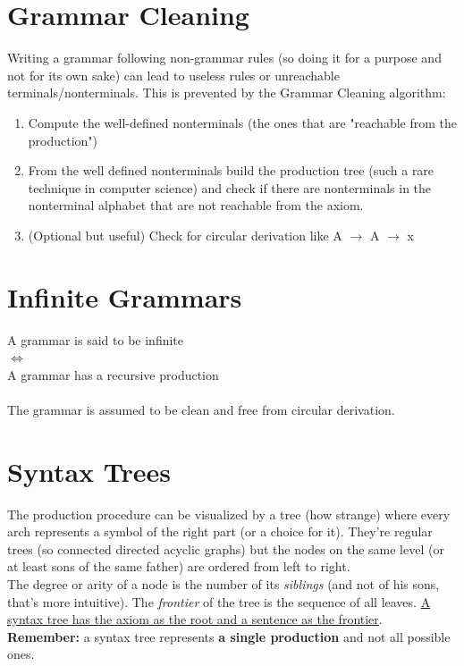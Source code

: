     \section{Grammar Cleaning}
        Writing a grammar following non-grammar rules (so doing it for a purpose and not for its own sake) can lead to useless rules or unreachable terminals/nonterminals. This is prevented by the Grammar Cleaning algorithm:
            \begin{enumerate}
                \item Compute the well-defined nonterminals (the ones that are "reachable from the production")
                \item From the well defined nonterminals build the production tree (such a rare technique in computer science) and check if there are nonterminals in the nonterminal alphabet that are not reachable from the axiom.
                \item (Optional but useful) Check for circular derivation like A $\rightarrow$ A $\rightarrow$ x
            \end{enumerate}
    
    \section{Infinite Grammars}
        A grammar is said to be infinite\\
        $\Leftrightarrow$\\
        A grammar has a recursive production\\\\
        The grammar is assumed to be clean and free from circular derivation. 
       
    \section{Syntax Trees}
    	The production procedure can be visualized by a tree (how strange) where every arch represents a symbol of the right part (or a choice for it). They're regular trees (so connected directed acyclic graphs) but the nodes on the same level (or at least sons of the same father) are ordered from left to right.\\
    	The degree or arity of a node is the number of its \emph{siblings} (and not of his sons, that's more intuitive). The \emph{frontier} of the tree is the sequence of all leaves. \underline{A syntax tree has the axiom as the root and a sentence as the frontier}.\\
    	\textbf{Remember:} a syntax tree represents \textbf{a single production} and not all possible ones.
	
